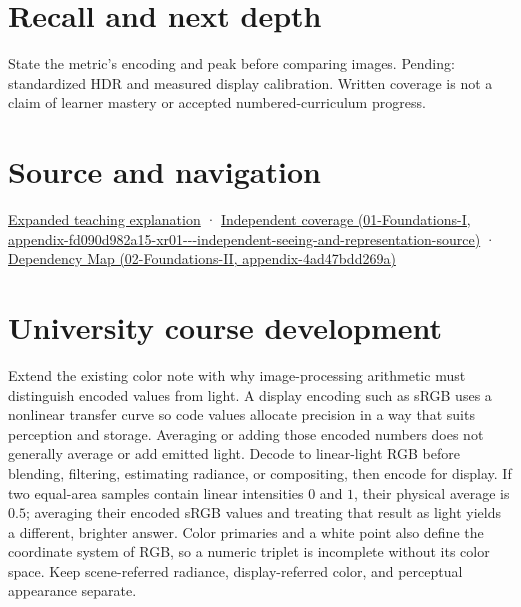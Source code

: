 \section{Recall and next depth}\label{appendix-a9f83ad40792-recall-and-next-depth}

State the metric's encoding and peak before comparing images. Pending: standardized HDR and measured display calibration. Written coverage is not a claim of learner mastery or accepted numbered-curriculum progress.

\section{Source and navigation}\label{appendix-a9f83ad40792-source-and-navigation}

\href{Continuous\%20Notes/University\%20-\%20Worlds,\%20Images\%20and\%20Inference\%20-\%20Graphics,\%20Vision\%20and\%20Photography\#Encoded\%20RGB\%20must\%20not\%20masquerade\%20as\%20linear\%20light}{Expanded teaching explanation} · \href{../01-Foundations-I/main.pdf\#nameddest=appendix-fd090d982a15-xr01---independent-seeing-and-representation-source}{Independent coverage (01-Foundations-I, appendix-fd090d982a15-xr01-\/-\/-independent-seeing-and-representation-source)} · \href{../02-Foundations-II/main.pdf\#nameddest=appendix-4ad47bdd269a}{Dependency Map (02-Foundations-II, appendix-4ad47bdd269a)}

\section{University course development}\label{appendix-a9f83ad40792-university-course-development}

Extend the existing color note with why image-processing arithmetic must distinguish encoded values from light. A display encoding such as sRGB uses a nonlinear transfer curve so code values allocate precision in a way that suits perception and storage. Averaging or adding those encoded numbers does not generally average or add emitted light. Decode to linear-light RGB before blending, filtering, estimating radiance, or compositing, then encode for display. If two equal-area samples contain linear intensities \(0\) and \(1\), their physical average is \(0.5\); averaging their encoded sRGB values and treating that result as light yields a different, brighter answer. Color primaries and a white point also define the coordinate system of RGB, so a numeric triplet is incomplete without its color space. Keep scene-referred radiance, display-referred color, and perceptual appearance separate.

